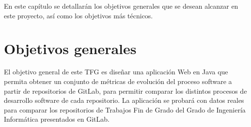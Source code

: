 
En este capítulo se detallarán los objetivos generales que se desean alcanzar en este proyecto, así como los objetivos más técnicos.

\section{Objetivos generales}
El objetivo general de este TFG es diseñar una aplicación Web en Java que permita obtener un conjunto de métricas de evolución del proceso software a partir de repositorios de GitLab, para permitir comparar los distintos procesos de desarrollo software de cada repositorio.
La aplicación se probará con datos reales para comparar los repositorios de Trabajos Fin de Grado del Grado de Ingeniería Informática presentados en GitLab.
   
